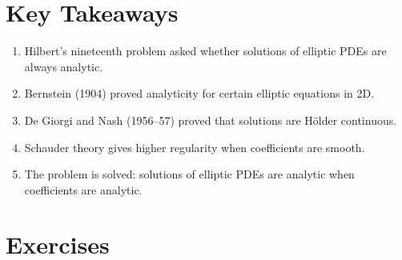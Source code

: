 \section*{Key Takeaways}

\begin{enumerate}
    \item Hilbert's nineteenth problem asked whether solutions of elliptic PDEs are always analytic.
    \item Bernstein (1904) proved analyticity for certain elliptic equations in 2D.
    \item De Giorgi and Nash (1956--57) proved that solutions are H\"older continuous.
    \item Schauder theory gives higher regularity when coefficients are smooth.
    \item The problem is solved: solutions of elliptic PDEs are analytic when coefficients are analytic.
\end{enumerate}

\section{Exercises}

